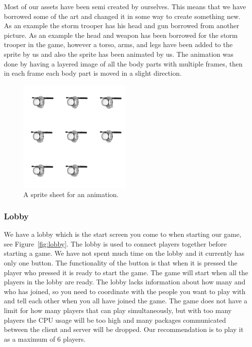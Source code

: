 \documentclass[a4paper]{article}
\begin{document}
Most of our assets have been semi created by ourselves. This means that we have borrowed some of the art and changed it in some way to create something new. As an example the storm trooper has his head and gun borrowed from another picture. As an example the head and weapon has been borrowed for the storm trooper in the game, however a torso, arms, and legs have been added to the sprite by us and also the sprite has been animated by us. The animation was done by having a layered image of all the body parts with multiple frames, then in each frame each body part is moved in a slight direction.

\begin{figure}
    \centering
    \includegraphics[width=0.5\textwidth]{pics/stormtrooper.png}
    \caption{A sprite sheet for an animation.}
    \label{fig:spritesheet}
\end{figure}

\subsubsection{Lobby}\label{sec:lobby}
We have a lobby which is the start screen you come to when starting our game, see Figure~\ref{fig:lobby}. The lobby is used to connect players together before starting a game. We have not spent much time on the lobby and it currently has only one button. The functionality of the button is that when it is pressed the player who pressed it is ready to start the game. The game will start when all the players in the lobby are ready. The lobby lacks information about how many and who has joined, so you need to coordinate with the people you want to play with and tell each other when you all have joined the game. The game does not have a limit for how many players that can play simultaneously, but with too many players the CPU usage will be too high and many packages communicated between the client and server will be dropped. Our recommendation is to play it as a maximum of 6 players.
\end{document}
